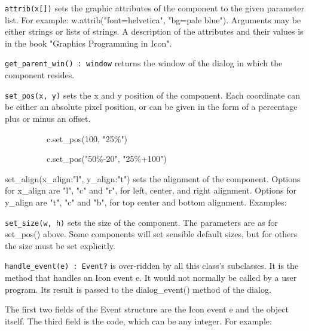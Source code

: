 \texttt{attrib(x[])} sets the graphic attributes of the component to the given
parameter list. For example:
w.attrib("font=helvetica",
"bg=pale blue"). Arguments may be either
strings or lists of strings. A description of the attributes and their
values is in the book "Graphics Programming in Icon".

\texttt{get\_parent\_win() : window} returns the window of the dialog in which
the component resides.

\texttt{set\_pos(x, y)} sets the x and y position of the component. Each
coordinate can be either an absolute pixel position, or can be given in
the form of a percentage plus or minus an offset.

{\ttfamily
\ \ \ \ \ \ \ \ \ \ c.set\_pos(100, "25\%")}

{\ttfamily
\ \ \ \ \ \ \ \ \ \ c.set\_pos("50\%-20",
"25\%+100")}

set\_align(x\_align:"l",
y\_align:"t") sets the alignment of the
component. Options for x\_align are "l", "c" and "r",
for left, center, and right alignment. Options for y\_align are
"t", "c" and "b", for top center and bottom alignment.
Examples:


\texttt{set\_size(w, h)} sets the size of the component. The parameters are as
for set\_pos() above. Some components will set sensible default sizes,
but for others the size must be set explicitly.

\texttt{handle\_event(e) : Event?} is over-ridden by all this
class's subclasses. It is the method that handles an
Icon event e. It would not normally be called by a user program. Its
result is passed to the dialog\_event() method of the dialog.

The first two fields of the Event structure are the Icon event e and the
object itself. The third field is the code, which can be any integer.
For example:


